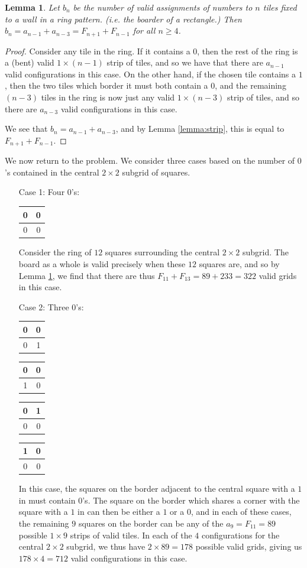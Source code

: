 \documentclass[a4paper,12pt]{article}
\newtheorem{lemma}{Lemma}
\newcommand{\grid}[4]{ %
    \begin{tabular}{|c|c|} %
        \hline %
        #1 & #2 \\
        \hline %
        #3 & #4 \\
        \hline %
    \end{tabular} %
}
\begin{document}
\begin{enumerate}
    \begin{lemma} \label{lemma:ring}
        Let $b_n$ be the number of valid assignments of numbers to $n$ tiles
        fixed to a wall in a ring pattern. (i.e. the boarder of a
        rectangle.) Then
        $b_n = a_{n-1} + a_{n-3} = F_{n+1} + F_{n-1}$ for all $n \geq 4$.
    \end{lemma}
    \begin{proof}
        Consider any tile in the ring. If it contains a $0$, then the rest of
        the ring is a (bent) valid $1 \times (n-1)$ strip of tiles, and so we
        have that there are $a_{n-1}$ valid configurations in this case. On the
        other hand, if the chosen tile contains a $1$, then the two tiles
        which border it must both contain a $0$, and the remaining $(n-3)$
        tiles in the ring is now just any valid $1 \times (n-3)$ strip of
        tiles, and so there are $a_{n-3}$ valid configurations in this case.
     
        We see that $b_n = a_{n-1} + a_{n-3}$, and by Lemma \ref{lemma:strip},
        this is equal to $F_{n+1} + F_{n-1}$.
    \end{proof}

We now return to the problem. We consider three cases based on the number
of $0$'s contained in the central $2 \times 2$ subgrid of squares.

\begin{enumerate}

    \item[Case 1:] Four $0$'s: \grid{0}{0}{0}{0}
        
        Consider the ring of $12$ squares surrounding the central $2 \times
        2$ subgrid. The board as a whole is valid precisely when these $12$
        squares are, and so by Lemma \ref{lemma:ring}, we find that there
        are thus $F_{11} + F_{13} = 89 + 233 = 322$ valid grids in this case.

    \item[Case 2:] Three $0$'s: \grid{0}{0}{0}{1} \grid{0}{0}{1}{0}
        \grid{0}{1}{0}{0} \grid{1}{0}{0}{0}

        In this case, the squares on the border adjacent to the central square
        with a $1$ in must contain $0$'s. The square on the border which shares
        a corner with the square with a $1$ in can then be either a $1$ or a
        $0$, and in each of these cases, the remaining $9$ squares on the
        border can be any of the $a_9 = F_{11} = 89$ possible $1 \times 9$
        strips of valid tiles. In each of the $4$ configurations for the central
        $2 \times 2$ subgrid, we thus have $2 \times 89 = 178$ possible valid
        grids, giving us $178 \times 4 = 712$ valid configurations in this
        case.


\end{enumerate}
\end{enumerate}
\end{document}
